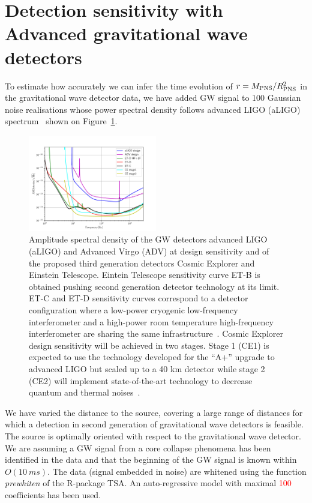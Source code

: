 \section{Detection sensitivity with Advanced gravitational wave detectors}
\label{sec:results}

To estimate how accurately we can infer the time evolution of $r=M_{\rm PNS}/R_{\rm PNS}^2$ in the
gravitational wave detector data, we have added  GW signal  to 
100 Gaussian noise realisations whose power spectral density follows  advanced LIGO (aLIGO)
spectrum~\cite{aLIGOsens:2018} shown on Figure~\ref{fig:spectrum}. 

\begin{figure}
 \centering
 \includegraphics[width=0.5\textwidth]{plots/spectrum}
 \caption{Amplitude spectral density of the GW detectors advanced LIGO (aLIGO) and Advanced Virgo (ADV) at design sensitivity and of the proposed third generation detectors Cosmic Explorer and Einstein Telescope. Eintein Telescope sensitivity curve ET-B is obtained pushing second generation detector technology at its limit. ET-C and ET-D sensitivity curves correspond to a detector configuration where a low-power cryogenic low-frequency interferometer and a high-power room temperature high-frequency interferometer are sharing the same infrastructure~\cite{Hild_2011}. Cosmic Explorer design sensitivity will be achieved in two stages. Stage 1 (CE1) is expected to use the technology developed for the “A+” upgrade to advanced LIGO but scaled up to a 40 km detector while stage 2 (CE2) will implement state-of-the-art technology to decrease quantum and thermal noises~\cite{reitze2019cosmic}. } \label{fig:spectrum}
\end{figure}

We have varied the distance to the source, covering a large
range of distances for which a detection in second generation of gravitational wave detectors
is feasible. The source is optimally oriented with
respect to the gravitational wave detector. We are assuming a GW signal from a core collapse
phenomena has been identified in the data and that the beginning of the GW signal is known within $O(10~ms)$.
The data (signal embedded in noise) are whitened using the function {\it prewhiten} of the R-package TSA.
An auto-regressive model with maximal \textcolor{red}{100} coefficients has been used.    

